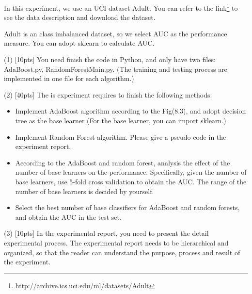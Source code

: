 \documentclass{article}
\begin{document}
	In this experiment, we use an UCI dataset Adult. You can refer to the link\footnote{http://archive.ics.uci.edu/ml/datasets/Adult} to see the data description and download the dataset.
	
	Adult is an class imbalanced dataset, so we select AUC as the performance measure. You can adopt sklearn to calculate AUC.
	
(1) [10pts] You need finish the code in Python, and only have two files: AdaBoost.py, RandomForestMain.py. (The training and testing process are implemented in one file for each algorithm.)
	
(2) [40pts] The is experiment requires to finish the following methods:
	
		\begin{itemize}
			\item Implement AdaBoost algorithm according to the Fig(8.3), and adopt decision tree as the base learner (For the base learner, you can import sklearn.)
			\item  Implement Random Forest algorithm. Please give a pseudo-code in the experiment report.
			\item According to the AdaBoost and random forest, analysis the effect of the number of base learners on the performance. Specifically, given the number of base learners, use 5-fold cross validation to obtain the AUC. The range of the number of base learners is decided by yourself.
			\item Select the best number of base classifiers for AdaBoost and random forests, and obtain the AUC in the test set.
		\end{itemize}

(3) [10pts] In the experimental report, you need to present the detail experimental process. The experimental report needs to be hierarchical and organized, so that the reader can understand the purpose, process and result of the experiment.
		
\end{document}

